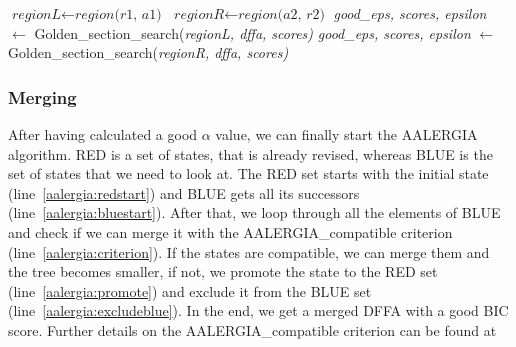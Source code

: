 \documentclass[
a4paper,     %
12pt         %
]{scrartcl}  %
\begin{document}
\begin{algorithm}[H]
\begin{algorithmic}[1]
        \Else
          \State $\textit{regionL} \gets \textit{region(r1, a1)}$
          \State $\textit{regionR} \gets \textit{region(a2, r2)}$
        \State \textit{good\_eps, scores, epsilon} $\gets$ Golden\_section\_search(\textit{regionL, dffa, scores)} \label{golden:leftregion}
         \State \textit{good\_eps, scores, epsilon} $\gets$ Golden\_section\_search(\textit{regionR, dffa, scores)} \label{golden:rightregion}
        \State \Return
        \EndIf
       \EndIf      
 
  \EndWhile
\end{algorithmic}
\end{algorithm}

\subsubsection{Merging }

After having calculated a good $\alpha$ value, we can finally start the AALERGIA algorithm. RED is a set of states, that is already revised, whereas BLUE is the set of states that we need to look at. The RED set starts with the initial state (line~\ref{aalergia:redstart}) and BLUE gets all its successors (line~\ref{aalergia:bluestart}). After that, we loop through all the elements of BLUE and check if we can merge it with the AALERGIA\_compatible criterion (line~\ref{aalergia:criterion}). If the states are compatible, we can merge them and the tree becomes smaller, if not, we promote the state to the RED set (line~\ref{aalergia:promote}) and exclude it from the BLUE set (line~\ref{aalergia:excludeblue}). In the end, we get a merged DFFA with a good BIC score. Further details on the AALERGIA\_compatible criterion can be found at \cite{Mao.}
\end{document}
